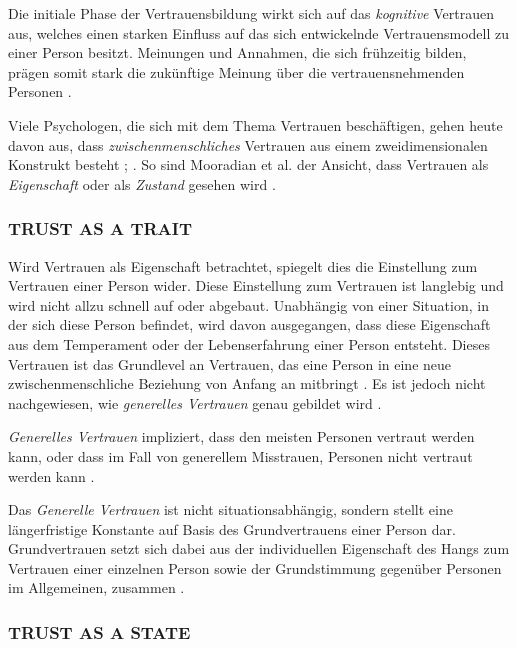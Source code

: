 \documentclass[sigchi]{acmart}
\begin{document}
Die initiale Phase der Vertrauensbildung wirkt sich auf das \textit{kognitive} Vertrauen aus, welches einen starken Einfluss auf das sich entwickelnde Vertrauensmodell zu einer Person besitzt.
Meinungen und Annahmen, die sich frühzeitig bilden, prägen somit stark die zukünftige Meinung über die vertrauensnehmenden Personen \citep[S. 461-462]{baldwin1992relational}.

Viele Psychologen, die sich mit dem Thema Vertrauen beschäftigen, gehen heute davon aus, dass \textit{zwischenmenschliches} Vertrauen aus einem zweidimensionalen Konstrukt besteht \citep{johnson2005cognitive}; \citep{cook1980new}. So sind Mooradian et al. der Ansicht, dass Vertrauen als \textit{Eigenschaft} oder als \textit{Zustand} gesehen wird \citep[S. 524-525]{mooradian2006trusts}.

\subsubsection{TRUST AS A TRAIT }
Wird Vertrauen als Eigenschaft betrachtet, spiegelt dies die Einstellung zum Vertrauen einer Person wider. Diese Einstellung zum Vertrauen ist langlebig und wird nicht allzu schnell auf oder abgebaut. Unabhängig von einer Situation, in der sich diese Person befindet, wird davon ausgegangen, dass diese Eigenschaft aus dem Temperament oder der Lebenserfahrung einer Person entsteht. Dieses Vertrauen ist das Grundlevel an Vertrauen, das eine Person in eine neue zwischenmenschliche Beziehung von Anfang an mitbringt \citep[S. 11]{couch1996assessment}. Es ist jedoch nicht nachgewiesen, wie \textit{generelles Vertrauen} genau gebildet wird \citep[S. 409]{stolle2002trusting}.

\textit{Generelles Vertrauen} impliziert, dass den meisten Personen vertraut werden kann, oder dass im Fall von generellem Misstrauen, Personen nicht vertraut werden kann \citep[S. 409]{stolle2002trusting}.

Das \textit{Generelle Vertrauen} ist nicht situationsabhängig, sondern stellt eine längerfristige Konstante auf Basis des Grundvertrauens einer Person dar. Grundvertrauen setzt sich dabei aus der individuellen Eigenschaft des Hangs zum Vertrauen einer einzelnen Person sowie der Grundstimmung gegenüber Personen im Allgemeinen, zusammen \citep[S. 11]{couch1996assessment}.

\subsubsection{TRUST AS A STATE}
\end{document}
